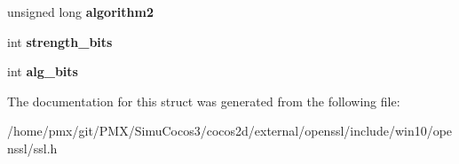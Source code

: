 \begin{DoxyCompactItemize}
\item 
\mbox{\label{structssl__cipher__st_aef80da6412c4e1fec8458c3c244d69e8}} 
unsigned long {\bfseries algorithm2}
\item 
\mbox{\label{structssl__cipher__st_ae3a40fb67452514df7770e334a99c32d}} 
int {\bfseries strength\+\_\+bits}
\item 
\mbox{\label{structssl__cipher__st_a451f084cd7c875897f5986a35a482628}} 
int {\bfseries alg\+\_\+bits}
\end{DoxyCompactItemize}


The documentation for this struct was generated from the following file\+:\begin{DoxyCompactItemize}
\item 
/home/pmx/git/\+P\+M\+X/\+Simu\+Cocos3/cocos2d/external/openssl/include/win10/openssl/ssl.\+h\end{DoxyCompactItemize}
